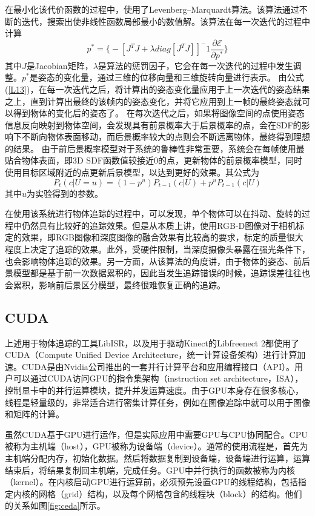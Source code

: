 在最小化该代价函数的过程中，使用了Levenberg–Marquardt算法。该算法通过不断的迭代，搜索出使非线性函数局部最小的数值解。该算法在每一次迭代的过程中计算
\begin{equation}\label{L13}
p^*=\Big\{-[J^TJ + \lambda diag[J^TJ]]^-1\frac{\partial\mathscr{E}}{\partial p^*}\Big\}
\end{equation}
其中$J$是Jacobian矩阵，$\lambda$是算法的惩罚因子，它会在每一次迭代的过程中发生调整。$p^*$是姿态的变化量，通过三维的位移向量和三维旋转向量进行表示。
由公式(\ref{L13})，在每一次迭代之后，将计算出的姿态变化量应用于上一次迭代的姿态结果之上，直到计算出最终的该帧内的姿态变化，并将它应用到上一帧的最终姿态就可以得到物体的变化后的姿态了。
在每次迭代之后，如果将图像空间的点使用姿态信息反向映射到物体空间，会发现具有前景概率大于后景概率的点，会在SDF的影响下不断向物体表面移动，而后景概率较大的点则会不断远离物体，最终得到理想的结果。
由于前后景概率模型对于系统的鲁棒性非常重要，系统会在每帧使用最贴合物体表面，即3D SDF函数值较接近0的点，更新物体的前景概率模型，同时使用目标区域附近的点更新后景模型，以达到更好的效果。其公式为
\begin{equation}
P_t(c|U=u)=(1-p^u)P_{t-1}(c|U) + p^uP_{t-1}(c|U)
\end{equation}
其中$u$为实验得到的参数。

在使用该系统进行物体追踪的过程中，可以发现，单个物体可以在抖动、旋转的过程中仍然具有比较好的追踪效果。但是从本质上讲，使用RGB-D图像对于相机标定的效果，即RGB图像和深度图像的融合效果有比较高的要求，标定的质量很大程度上决定了追踪的效果。此外，受硬件限制，当深度摄像头暴露在强光条件下，也会影响物体追踪的效果。另一方面，从该算法的角度讲，由于物体的姿态、前后景模型都是基于前一次数据累积的，因此当发生追踪错误的时候，追踪误差往往也会累积，影响前后景区分模型，最终很难恢复正确的追踪。

\subsection{CUDA}
上述用于物体追踪的工具LibISR，以及用于驱动Kinect的Libfreenect 2都使用了CUDA\cite{CUDARef}（Compute Unified Device Architecture，统一计算设备架构）进行计算加速。CUDA是由Nvidia公司推出的一套并行计算平台和应用编程接口（API）。用户可以通过CUDA访问GPU的指令集架构（instruction set architecture，ISA），控制显卡中的并行运算模块，提升并发运算速度。由于GPU本身存在很多核心，线程是轻量级的，非常适合进行密集计算任务，例如在图像追踪中就可以用于图像和矩阵的计算。

虽然CUDA基于GPU进行运作，但是实际应用中需要GPU与CPU协同配合。CPU被称为主机端（host），GPU被称为设备端（device）。通常的使用流程是，首先为主机端分配内存，初始化数据。然后将数据复制到设备端，设备端进行运算，运算结束后，将结果复制回主机端，完成任务。GPU中并行执行的函数被称为内核（kernel）。在内核启动GPU进行运算前，必须预先设置GPU的线程结构，包括指定内核的网格（grid）结构，以及每个网格包含的线程块（block）的结构。他们的关系如图\ref{fig:ceda}所示。

